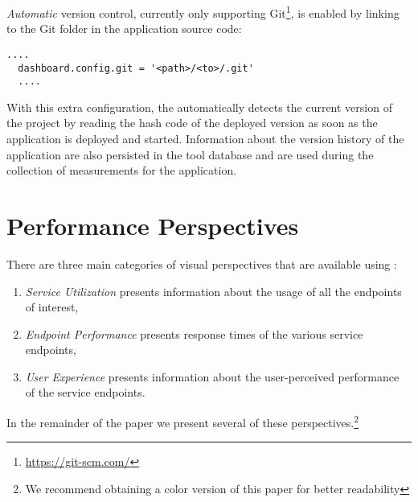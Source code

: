 \documentclass{sig-alternate-05-2015}
\begin{document}
  \textit{Automatic} version control, currently only supporting Git\footnote{\url{https://git-scm.com/}}, is enabled by linking to the Git folder in the application source code: 
  
  \begin{lstlisting}[style=custompython]
  ....
  dashboard.config.git = '<path>/<to>/.git'
  ....
  \end{lstlisting}  
  
  With this extra configuration, the \tool automatically detects the current version of the project by reading the hash code of the deployed version as soon as the application is deployed and started. Information about the version history of the application are also persisted in the tool database and are used during the collection of measurements for the application.
  
 

\section{Performance Perspectives}
\label{sec:views}


  There are three main categories of visual perspectives that are available using \tool:
  \begin{enumerate}
    \item \textit{Service Utilization} presents information about the usage of all the endpoints of interest,
    \item \textit{Endpoint Performance} presents response times of the various service endpoints,
    \item \textit{User Experience} presents information about the user-perceived performance of the service endpoints.
  \end{enumerate}

  In the remainder of the paper we present several of these perspectives.\footnote{We recommend obtaining a color version of this paper for better readability}

\end{document}
